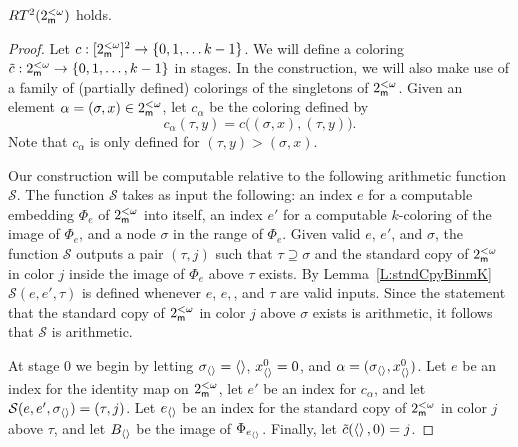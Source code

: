 \begin{prop}[\ACAo]\label{P:binmRamsey2}
$RT^2(2^{<\omega}_{\mathsf{m}})$ holds.
\end{prop}
\begin{proof}
Let $c:[2^{<\omega}_{\mathsf{m}}]^2\to\{0,1,\ldots k-1\}$.
We will define a coloring $\tilde{c}:2^{<\omega}_{\mathsf{m}}\to\{0,1,\ldots,k-1\}$ in stages.
In the construction, we will also make use of a family of (partially defined) colorings
of the singletons of $2^{<\omega}_{\mathsf{m}}$. Given an element $\alpha=(\sigma,x)\in2^{<\omega}_{\mathsf{m}}$,
let $c_\alpha$ be the coloring defined by
$$c_\alpha(\tau,y)=c\big((\sigma,x),(\tau,y)\Big).$$
Note that $c_\alpha$ is only defined for $(\tau,y)>(\sigma,x)$.

Our construction will be computable relative to the following
arithmetic function $\mathcal{S}$.
The function $\mathcal{S}$ takes as input the following:
an index $e$ for a computable embedding $\Phi_e$ of $2^{<\omega}_{\mathsf{m}}$ into itself,
an index $e'$ for a computable $k$-coloring of the image of $\Phi_e$,
and a node $\sigma$ in the range of $\Phi_e$.
Given valid $e$, $e'$, and $\sigma$, the function $\mathcal{S}$
outputs a pair $(\tau,j)$ such that $\tau\supseteq\sigma$
and the standard copy of $2^{<\omega}_{\mathsf{m}}$ in color $j$ inside the image of $\Phi_e$
above $\tau$ exists.
By Lemma~\ref{L:stndCpyBinmK} $\mathcal{S}(e,e',\tau)$ is defined
whenever $e$, $e,$, and $\tau$ are valid inputs.
Since the statement that the standard copy of $2^{<\omega}_{\mathsf{m}}$ in color $j$ above $\sigma$ exists
is arithmetic, it follows that $\mathcal{S}$ is arithmetic.

At stage 0 we begin by letting $\sigma_{\left\langle \right\rangle}=\left\langle \right\rangle$,
$x_{\left\langle \right\rangle}^0=0$, and $\alpha=(\sigma_{\left\langle \right\rangle},x^0_{\left\langle \right\rangle})$.
Let $e$ be an index for the identity map on $2^{<\omega}_{\mathsf{m}}$,
let $e'$ be an index for $c_{\alpha}$, and let $\mathcal{S}(e,e',\sigma_{\left\langle \right\rangle})=(\tau,j)$.
Let $e_{\left\langle \right\rangle}$ be an index for the standard copy of $2^{<\omega}_{\mathsf{m}}$ in color $j$
above $\tau$, and let $B_{\left\langle \right\rangle}$ be the image of $\Phi_{e_{\left\langle \right\rangle}}$.
Finally, let $\tilde{c}(\left\langle \right\rangle,0)=j$.


\end{proof}
